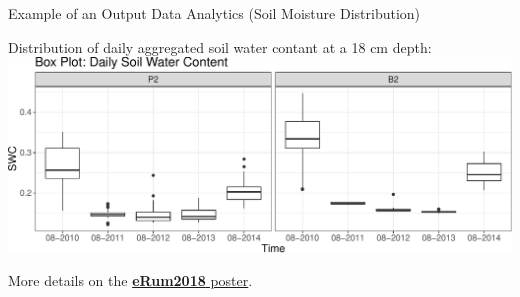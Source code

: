 \documentclass[ignorenonframetext,]{beamer}
\begin{document}
\begin{frame}{Example of an Output Data Analytics (Soil Moisture
Distribution)}

Distribution of daily aggregated soil water contant at a 18 cm depth:
\includegraphics{presentation_files/figure-beamer/unnamed-chunk-18-1.pdf}

More details on the
\href{https://github.com/ecor/geotopbricks_doc/blob/master/erum2018_poster/erum2018_poster_cordano_et_al.png}{\textbf{eRum2018}
poster}.

\end{frame}
\end{document}
